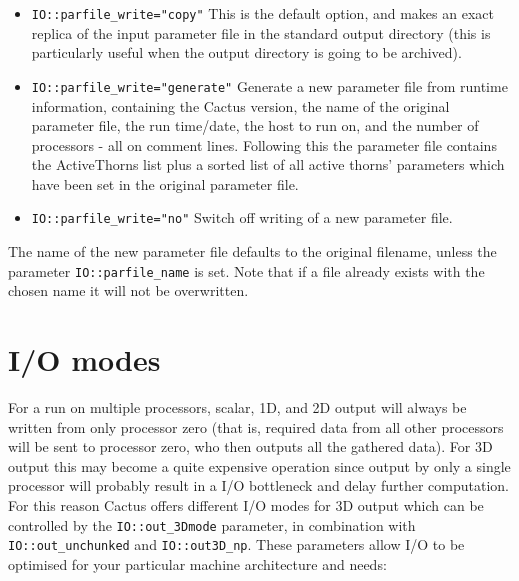 \documentclass{article}
\begin{document}
\begin{itemize}

  \item{\tt IO::parfile\_write="copy"} This is the default option,
  and makes an exact replica of the input parameter file in the
  standard output directory (this is particularly useful when the
  output directory is going to be archived).

  \item{\tt IO::parfile\_write="generate"} Generate a new parameter
  file from runtime information, containing the Cactus version, the
  name of the original parameter file, the run time/date, the host to
  run on, and the number of processors - all on comment
  lines. Following this the parameter file contains the ActiveThorns
  list plus a sorted list of all active thorns' parameters which have
  been set in the original parameter file.

  \item{\tt IO::parfile\_write="no"} Switch off writing of a new 
	parameter file.

\end{itemize}

The name of the new parameter file defaults to the original filename, 
unless the parameter {\tt IO::parfile\_name} is set. Note that if a file
already exists with the chosen name it will not be overwritten.
  

\section{I/O modes}
\label{iomodes}
For a run on multiple processors, scalar, 1D, and 2D output will always be 
written from only processor zero (that is, required data from all other
processors will be sent to processor zero, who then outputs all the gathered
data).
For 3D output this may become a quite expensive operation since output
by only a single processor will probably result in a I/O bottleneck and delay
further computation. 
For this reason Cactus offers different I/O modes for 3D output which can be
controlled by the {\tt IO::out\_3Dmode} parameter, in combination with
 {\tt IO::out\_unchunked} and {\tt IO::out3D\_np}. These parameters allow
I/O to be optimised for your particular machine architecture and needs: 
\end{document}
